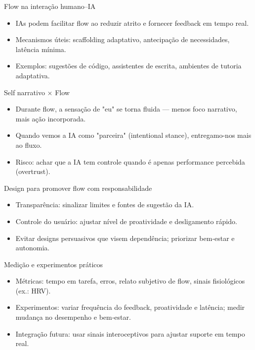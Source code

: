 \documentclass[aspectratio=169,12pt]{beamer}
\begin{document}
\begin{frame}{Flow na interação humano–IA}
  \begin{itemize}
    \item IAs podem facilitar flow ao reduzir atrito e fornecer feedback em tempo real.
    \item Mecanismos úteis: scaffolding adaptativo, antecipação de necessidades, latência mínima.
    \item Exemplos: sugestões de código, assistentes de escrita, ambientes de tutoria adaptativa.
  \end{itemize}
\end{frame}

\begin{frame}{Self narrativo × Flow}
  \begin{itemize}
    \item Durante flow, a sensação de "eu" se torna fluida — menos foco narrativo, mais ação incorporada.
    \item Quando vemos a IA como "parceira" (intentional stance), entregamo-nos mais ao fluxo.
    \item Risco: achar que a IA tem controle quando é apenas performance percebida (overtrust).
  \end{itemize}
\end{frame}

\begin{frame}{Design para promover flow com responsabilidade}
  \begin{itemize}
    \item Transparência: sinalizar limites e fontes de sugestão da IA.
    \item Controle do usuário: ajustar nível de proatividade e desligamento rápido.
    \item Evitar designs persuasivos que visem dependência; priorizar bem‑estar e autonomia. \faCheckCircle
  \end{itemize}
\end{frame}

\begin{frame}{Medição e experimentos práticos}
  \begin{itemize}
    \item Métricas: tempo em tarefa, erros, relato subjetivo de flow, sinais fisiológicos (ex.: HRV).
    \item Experimentos: variar frequência do feedback, proatividade e latência; medir mudança no desempenho e bem‑estar.
    \item Integração futura: usar sinais interoceptivos para ajustar suporte em tempo real.
  \end{itemize}
\end{frame}
\end{document}
